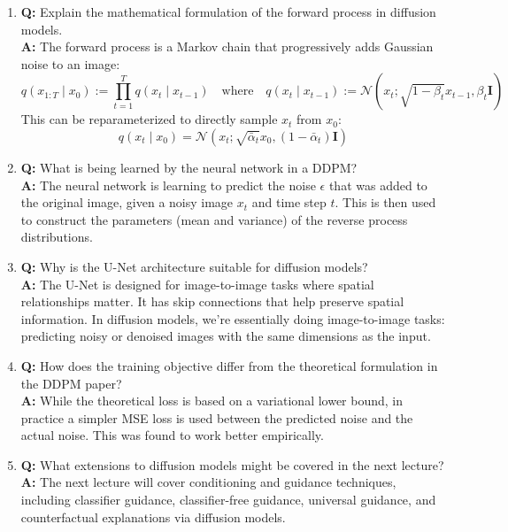 \begin{enumerate}
    \item \textbf{Q:} Explain the mathematical formulation of the forward process in diffusion models.\\
    \textbf{A:} The forward process is a Markov chain that progressively adds Gaussian noise to an image:
    \[
    q(x_{1:T} \mid x_0) := \prod_{t=1}^{T} q(x_t \mid x_{t-1})
    \quad \text{where} \quad q(x_t \mid x_{t-1}) := \mathcal{N}(x_t; \sqrt{1 - \beta_t} x_{t-1}, \beta_t \mathbf{I})
    \]
    This can be reparameterized to directly sample $x_t$ from $x_0$:
    \[
    q(x_t \mid x_0) = \mathcal{N}(x_t; \sqrt{\bar{\alpha}_t} x_0, (1 - \bar{\alpha}_t) \mathbf{I})
    \]

    \item \textbf{Q:} What is being learned by the neural network in a DDPM?\\
    \textbf{A:} The neural network is learning to predict the noise $\epsilon$ that was added to the original image, given a noisy image $x_t$ and time step $t$. This is then used to construct the parameters (mean and variance) of the reverse process distributions.

    \item \textbf{Q:} Why is the U-Net architecture suitable for diffusion models?\\
    \textbf{A:} The U-Net is designed for image-to-image tasks where spatial relationships matter. It has skip connections that help preserve spatial information. In diffusion models, we’re essentially doing image-to-image tasks: predicting noisy or denoised images with the same dimensions as the input.

    \item \textbf{Q:} How does the training objective differ from the theoretical formulation in the DDPM paper?\\
    \textbf{A:} While the theoretical loss is based on a variational lower bound, in practice a simpler MSE loss is used between the predicted noise and the actual noise. This was found to work better empirically.

    \item \textbf{Q:} What extensions to diffusion models might be covered in the next lecture?\\
    \textbf{A:} The next lecture will cover conditioning and guidance techniques, including classifier guidance, classifier-free guidance, universal guidance, and counterfactual explanations via diffusion models.
\end{enumerate}

